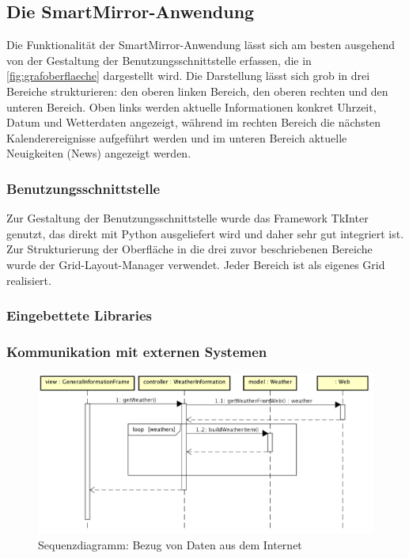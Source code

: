 \subsection{Die SmartMirror-Anwendung}

Die Funktionalität der SmartMirror-Anwendung lässt sich am besten ausgehend von der Gestaltung der Benutzungsschnittstelle erfassen, die in \autoref{fig:grafoberflaeche} dargestellt wird. Die Darstellung lässt sich grob in drei Bereiche strukturieren: den oberen linken Bereich, den oberen rechten und den unteren Bereich. Oben links werden aktuelle Informationen konkret Uhrzeit, Datum und Wetterdaten angezeigt, während im rechten Bereich die nächsten Kalenderereignisse aufgeführt werden und im unteren Bereich aktuelle Neuigkeiten (News) angezeigt werden.

\subsubsection*{Benutzungsschnittstelle}

Zur Gestaltung der Benutzungsschnittstelle wurde das Framework TkInter genutzt, das direkt mit Python ausgeliefert wird und daher sehr gut integriert ist. Zur Strukturierung der Oberfläche in die drei zuvor beschriebenen Bereiche wurde der Grid-Layout-Manager verwendet. Jeder Bereich ist als eigenes Grid realisiert.
 

\subsubsection*{Eingebettete Libraries}

\subsubsection*{Kommunikation mit externen Systemen}
\label{subsec:kommunikation}


\begin{figure}
	\centering
	\includegraphics[width=0.7\linewidth]{bilder/sequenceDiagramGettingDataNoBackground}
	\caption{Sequenzdiagramm: Bezug von Daten aus dem Internet}
	\label{fig:sequenzDiagramData}
\end{figure}

